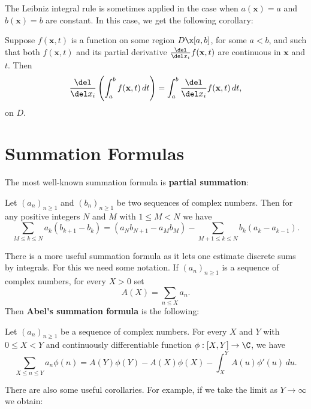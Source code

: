     The Leibniz integral rule is sometimes applied in the case when $a(\mathbf{x}) = a$ and $b(\mathbf{x}) = b$ are constant. In this case, we get the following corollary:

    \begin{corollary}
      Suppose $f(\mathbf{x},t)$ is a function on some region $D \x [a,b]$, for some $a < b$, and such that both $f(\mathbf{x},t)$ and its partial derivative $\frac{\del}{\del x_{i}}f(\mathbf{x},t)$ are continuous in $\mathbf{x}$ and $t$. Then
      \[
        \frac{\del}{\del x_{i}}\left(\int_{a}^{b}f(\mathbf{x},t)\,dt\right) = \int_{a}^{b}\frac{\del}{\del x_{i}}f(\mathbf{x},t)\,dt,
      \]
      on $D$.
    \end{corollary}
  \section{Summation Formulas}\label{append:Summation_Formulas}
    The most well-known summation formula is \textbf{partial summation}:

    \begin{theorem}\label{thm:partial_summation}
      Let $(a_{n})_{n \ge 1}$ and $(b_{n})_{n \ge 1}$ be two sequences of complex numbers. Then for any positive integers $N$ and $M$ with $1 \le M < N$ we have
      \[
        \sum_{M \le k \le N}a_{k}(b_{k+1}-b_{k}) = (a_{N}b_{N+1}-a_{M}b_{M})-\sum_{M+1 \le k \le N}b_{k}(a_{k}-a_{k-1}).
      \]
    \end{theorem}
    
    There is a more useful summation formula as it lets one estimate discrete sums by integrals. For this we need some notation. If $(a_{n})_{n \ge 1}$ is a sequence of complex numbers, for every $X > 0$ set
    \[
        A(X) = \sum_{n \le X}a_{n}.
    \]
    Then \textbf{Abel's summation formula} is the following:

    \begin{theorem}
      Let $(a_{n})_{n \ge 1}$ be a sequence of complex numbers. For every $X$ and $Y$ with $0 \le X < Y$ and continuously differentiable function $\phi:[X,Y] \to \C$, we have
      \[
        \sum_{X \le n \le Y}a_{n}\phi(n) = A(Y)\phi(Y)-A(X)\phi(X)-\int_{X}^{Y}A(u)\phi'(u)\,du.
      \]
    \end{theorem}

    There are also some useful corollaries. For example, if we take the limit as $Y \to \infty$ we obtain:

